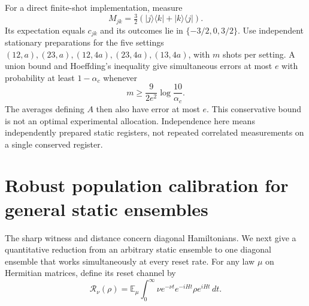 \documentclass[11pt,a4paper]{article}
\newcommand{\E}{\mathbb E}
\begin{document}
For a direct finite-shot implementation, measure
\[
 M_{jk}=\tfrac32(|j\rangle\langle k|+|k\rangle\langle j|).
\]
Its expectation equals $c_{jk}$ and its outcomes lie in
$\{-3/2,0,3/2\}$. Use independent stationary preparations for the
five settings $(12,a),(23,a),(12,4a),(23,4a),(13,4a)$, with $m$
shots per setting. A union bound and Hoeffding's inequality give
simultaneous errors at most $e$ with probability at least $1-\alpha_c$
whenever
\begin{equation}\label{eq:shots}
 m\geq\frac{9}{2e^2}\log\frac{10}{\alpha_c}.
\end{equation}
The averages defining $A$ then also have error at most $e$.
This conservative bound is not an optimal experimental allocation.
Independence here means independently prepared static registers, not
repeated correlated measurements on a single conserved register.

\section{Robust population calibration for general static ensembles}
The sharp witness and distance concern diagonal Hamiltonians. We
next give a quantitative reduction from an arbitrary static ensemble
to one diagonal ensemble that works simultaneously at every reset rate.
For any law $\mu$ on Hermitian matrices, define its reset channel by
\[
 \mathcal R_\nu(\rho)=\E_\mu\int_0^\infty\nu e^{-\nu t}
                       e^{-iHt}\rho e^{iHt}\,dt.
\]
\end{document}
